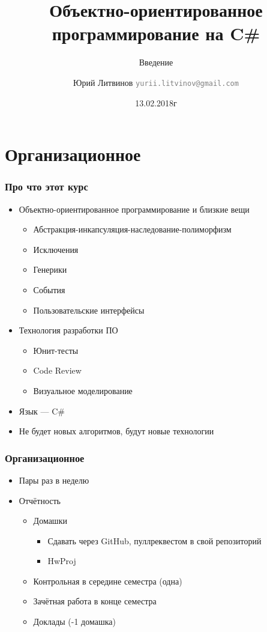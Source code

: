 \documentclass[xetex,mathserif,serif]{beamer}
\title{Объектно-ориентированное программирование на C\#}
\subtitle{Введение}
\author[Юрий Литвинов]{Юрий Литвинов \newline \textcolor{gray}{\small\texttt{yurii.litvinov@gmail.com}}}
\date{13.02.2018г}
\begin{document}
	
	\frame{\titlepage}

	\section{Организационное}

	\begin{frame}
		\frametitle{Про что этот курс}
		\begin{itemize}
			\item Объектно-ориентированное программирование и близкие вещи
			\begin{itemize}
				\item Абстракция-инкапсуляция-наследование-полиморфизм
				\item Исключения
				\item Генерики
				\item События
				\item Пользовательские интерфейсы
			\end{itemize}
			\item Технология разработки ПО
			\begin{itemize}
				\item Юнит-тесты
				\item Code Review
				\item Визуальное моделирование
			\end{itemize}
			\item Язык --- C\#
			\item Не будет новых алгоритмов, будут новые технологии
		\end{itemize}
	\end{frame}

	\begin{frame}
		\frametitle{Организационное}
		\begin{itemize}
			\item Пары раз в неделю
			\item Отчётность
			\begin{itemize}
				\item Домашки
				\begin{itemize}
					\item Сдавать через GitHub, пуллреквестом в свой репозиторий
					\item HwProj
				\end{itemize}
				\item Контрольная в середине семестра (одна)
				\item Зачётная работа в конце семестра
				\item Доклады (-1 домашка)
			\end{itemize}
		\end{itemize}
	\end{frame}
\end{document}
